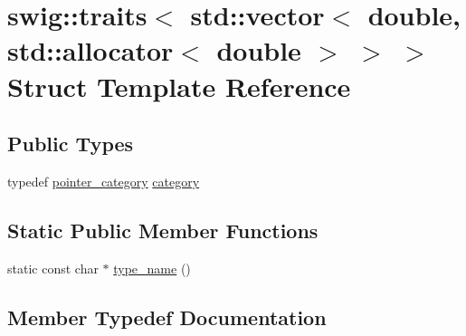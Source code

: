 \hypertarget{structswig_1_1traits_3_01std_1_1vector_3_01double_00_01std_1_1allocator_3_01double_01_4_01_4_01_4}{}\section{swig\+:\+:traits$<$ std\+:\+:vector$<$ double, std\+:\+:allocator$<$ double $>$ $>$ $>$ Struct Template Reference}
\label{structswig_1_1traits_3_01std_1_1vector_3_01double_00_01std_1_1allocator_3_01double_01_4_01_4_01_4}
\subsection*{Public Types}
\begin{DoxyCompactItemize}
\item 
typedef \hyperlink{structswig_1_1pointer__category}{pointer\+\_\+category} \hyperlink{structswig_1_1traits_3_01std_1_1vector_3_01double_00_01std_1_1allocator_3_01double_01_4_01_4_01_4_a70c608477567968995b8654448121595}{category}
\end{DoxyCompactItemize}
\subsection*{Static Public Member Functions}
\begin{DoxyCompactItemize}
\item 
static const char $\ast$ \hyperlink{structswig_1_1traits_3_01std_1_1vector_3_01double_00_01std_1_1allocator_3_01double_01_4_01_4_01_4_aa34cfd8fe03073e6f32fc33cf48a5cf3}{type\+\_\+name} ()
\end{DoxyCompactItemize}


\subsection{Member Typedef Documentation}
\mbox{\label{structswig_1_1traits_3_01std_1_1vector_3_01double_00_01std_1_1allocator_3_01double_01_4_01_4_01_4_a70c608477567968995b8654448121595}} 
